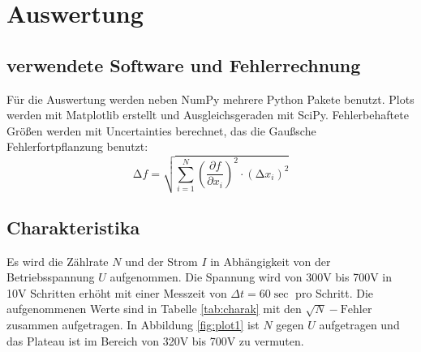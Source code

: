 \section{Auswertung}
\label{sec:Auswertung}

\subsection{verwendete Software und Fehlerrechnung}
\label{sec:SoftwareFehlerrechnung}

Für die Auswertung werden neben NumPy\cite{numpy} mehrere Python Pakete benutzt.
Plots werden mit Matplotlib\cite{matplotlib} erstellt und Ausgleichsgeraden mit SciPy\cite{scipy}.
Fehlerbehaftete Größen werden mit Uncertainties\cite{uncertainties} berechnet, das die Gaußsche Fehlerfortpflanzung benutzt:
\begin{equation*}
    \increment f = \sqrt{\sum_{i=1}^N \left( \frac{\partial f}{\partial x_i} \right)^{2} \cdot (\increment x_i)^{2}}
    \label{eqn:fehler}
\end{equation*}


\subsection{Charakteristika}
\label{sec:charak}

Es wird die Zählrate $N$ und der Strom $I$ in Abhängigkeit von der Betriebsspannung $U$ aufgenommen.
Die Spannung wird von 300V bis 700V in 10V Schritten erhöht mit einer Messzeit von $\Delta t = 60 \si{\sec}$ pro Schritt.
Die aufgenommenen Werte sind in Tabelle \ref{tab:charak} mit den $\sqrt{N}-\text{Fehler}$ zusammen aufgetragen.
In Abbildung \ref{fig:plot1} ist $N$ gegen $U$ aufgetragen und das Plateau ist im Bereich von 320V bis 700V zu vermuten. 


